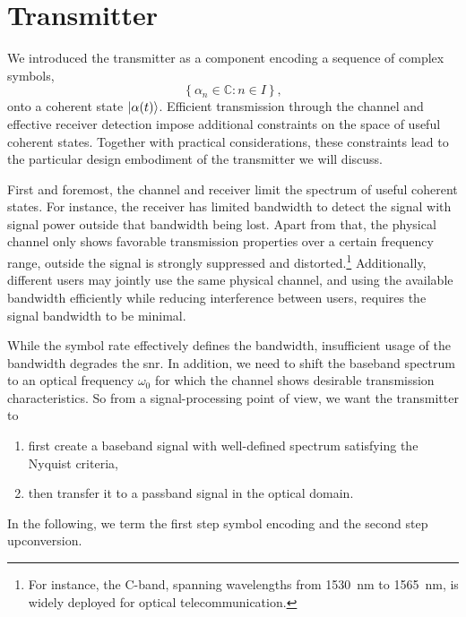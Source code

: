 \section{Transmitter}                                                                                                                                                                                                                                                                                                                                                                                                                                                                                                                                                                                                                                                                                                                     

We introduced the transmitter as a component encoding a sequence of complex symbols,
\begin{equation}
	\left\{
		\alpha_n\in\mathbb{C}
		\colon
		n\in I
	\right\}
	,
\end{equation}
onto a coherent state $\lvert\alpha(t)\rangle$.
Efficient transmission through the channel and effective receiver detection impose additional constraints on the space of useful coherent states.
Together with practical considerations, these constraints lead to the particular design embodiment of the transmitter we will discuss.

First and foremost, the channel and receiver limit the spectrum of useful coherent states.
For instance, the receiver has limited bandwidth to detect the signal with signal power outside that bandwidth being lost.
Apart from that, the physical channel only shows favorable transmission properties over a certain frequency range, outside the signal is strongly suppressed and distorted.\footnote{For instance, the C-band, spanning wavelengths from \SI{1530}{\nano\meter} to \SI{1565}{\nano\meter}, is widely deployed for optical telecommunication.}
Additionally, different users may jointly use the same physical channel, and using the available bandwidth efficiently while reducing interference between users, requires the signal bandwidth to be minimal.

While the symbol rate effectively defines the bandwidth, insufficient usage of the bandwidth degrades the \gls{snr}.
In addition, we need to shift the baseband spectrum to an optical frequency $\omega_0$ for which the channel shows desirable transmission characteristics.
So from a signal-processing point of view, we want the transmitter to
\begin{enumerate}
	\item first create a baseband signal with well-defined spectrum satisfying the Nyquist criteria,
	\item then transfer it to a passband signal in the optical domain.
\end{enumerate}
In the following, we term the first step symbol encoding and the second step upconversion.

